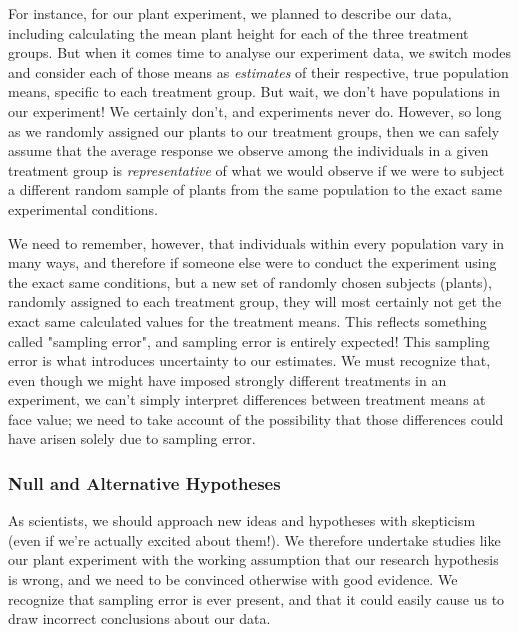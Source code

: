 \documentclass[
]{book}
\begin{document}
For instance, for our plant experiment, we planned to describe our data, including calculating the mean plant height for each of the three treatment groups. But when it comes time to analyse our experiment data, we switch modes and consider each of those means as \emph{estimates} of their respective, true population means, specific to each treatment group. But wait, we don't have populations in our experiment! We certainly don't, and experiments never do. However, so long as we randomly assigned our plants to our treatment groups, then we can safely assume that the average response we observe among the individuals in a given treatment group is \emph{representative} of what we would observe if we were to subject a different random sample of plants from the same population to the exact same experimental conditions.

We need to remember, however, that individuals within every population vary in many ways, and therefore if someone else were to conduct the experiment using the exact same conditions, but a new set of randomly chosen subjects (plants), randomly assigned to each treatment group, they will most certainly not get the exact same calculated values for the treatment means. This reflects something called "sampling error", and sampling error is entirely expected! This sampling error is what introduces uncertainty to our estimates. We must recognize that, even though we might have imposed strongly different treatments in an experiment, we can't simply interpret differences between treatment means at face value; we need to take account of the possibility that those differences could have arisen solely due to sampling error.

\hypertarget{null-and-alternative-hypotheses}{%
\subsubsection*{Null and Alternative Hypotheses}\label{null-and-alternative-hypotheses}}

As scientists, we should approach new ideas and hypotheses with skepticism (even if we're actually excited about them!). We therefore undertake studies like our plant experiment with the working assumption that our research hypothesis is wrong, and we need to be convinced otherwise with good evidence. We recognize that sampling error is ever present, and that it could easily cause us to draw incorrect conclusions about our data.
\end{document}
